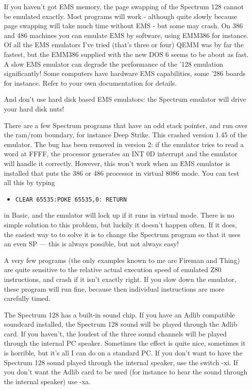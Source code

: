     If you haven't got EMS memory, the page swapping of the Spectrum 128
    cannot be emulated exactly.  Most programs will work - although quite
    slowly because page swapping will take much time without EMS - but some
    may crash.  On 386 and 486 machines you can emulate EMS by software,
    using EMM386 for instance.  Of all the EMS emulators I've tried (that's
    three or four) QEMM was by far the fastest, but the EMM386 supplied with
    the new DOS 6 seems to be about as fast.  A slow EMS emulator can
    degrade the performance of the '128 emulation significantly!  Some
    computers have hardware EMS capabilities, some '286 boards for instance.
    Refer to your own documentation for details.

    And don't use hard disk based EMS emulators: the Spectrum emulator will
    drive your hard disk nuts!

    There are a few Spectrum programs that have an odd stack pointer, and
    run over the ram/rom boundary, for instance Deep Strike.  This crashed
    version 1.45 of the emulator.  The bug has been removed in version 2: if
    the emulator tries to read a word at FFFF, the processor generates an
    INT 0D interrupt and the emulator will handle it correctly. However,
    this won't work when an EMS emulator is installed that puts the 386 or
    486 processor in virtual 8086 mode.  You can test all this by typing
\begin{itemize}
  \item[]  \verb|CLEAR 65535:POKE 65535,0: RETURN|
\end{itemize}
    in Basic, and the emulator will lock up
    if it runs in virtual mode.  There is no simple solution to this
    problem, but luckily it doesn't happen often.  If it does, the easiest
    way to to solve it is to change the Spectrum program so that it uses an
    even SP --- this is always possible, but not always easy!

    A very few programs (the only examples known to me are Fireman and
    Thing) are quite sensitive to the relative actual execution speed of
    emulated Z80 instructions, and crash if it isn't exactly right. If you
    slow down the emulator, these program will run fine, because then
    individual instructions are more carefully timed.

    The Spectrum 128 has a built-in sound chip.  If you have an Adlib
    compatible soundcard installed, the Spectrum 128 sound will be played
    through the Adlib card.  If you haven't, the loudest of the three sound
    channels will be played through the internal PC speaker.  Sometimes the
    effect is quite nice, sometimes it is horrible, but it's all I can do on
    a standard PC\@.  If you don't want to have the Spectrum 128 sound played
    through the internal speaker, use the switch -xi.  If you don't want the
    Adlib card to be used (for instance to hear the sound through the
    internal speaker) use -xa.

